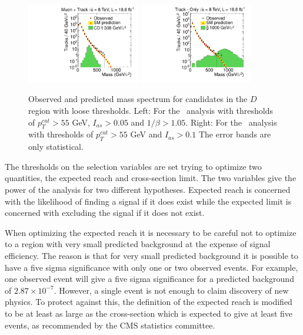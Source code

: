 \begin{figure}
 \begin{center}
  \includegraphics[clip=true, trim=0.0cm 0cm 2.8cm 0cm,width=0.44\textwidth]{figures/tkmu/RescaleNoRatio_Mass_8TeV_LooseNoSMMC}
  \includegraphics[clip=true, trim=0.0cm 0cm 2.8cm 0cm,width=0.44\textwidth]{figures/tkonly/RescaleNoRatio_Mass_8TeV_LooseNoSMMC}
 \end{center}
 \caption[Observed and predicted mass spectrum for candidates in the signal region with loose thresholds in the \tktof\ and \tkonly\ analyses.]
{Observed and predicted mass spectrum for candidates in the $D$ region with loose thresholds.
Left: For the \tktof\ analysis with thresholds of $p_T^{cut}>55$ GeV, $I_{as}>0.05$ and $1/\beta>1.05$.
Right: For the \tkonly\ analysis with thresholds of $p_T^{cut}>55$ GeV and $I_{as}>0.1$
The error bands are only statistical.}
\label{fig:MassDistribution}
\end{figure}

The thresholds on the selection variables are set trying to optimize two quantities, the expected reach and cross-section limit.
The two variables give the power of the analysis for two different hypotheses. Expected reach is concerned with the likelihood of finding a signal if it does exist while the
expected limit is concerned with excluding the signal if it does not exist.

When optimizing the expected reach it is necessary to be careful not to optimize to
a region with very small predicted background at the expense of signal efficiency. 
The reason is that for very small predicted background it is possible to have a five sigma
significance with only one or two observed events. For example, one observed event will give a five sigma significance for a predicted background of $2.87\times10^{-7}$.
However, a single event is not enough to claim discovery of new physics. To protect against this, the definition of the expected reach is modified to be at least as large as
the cross-section which is expected to give at least five events, as recommended by the CMS statistics committee.

